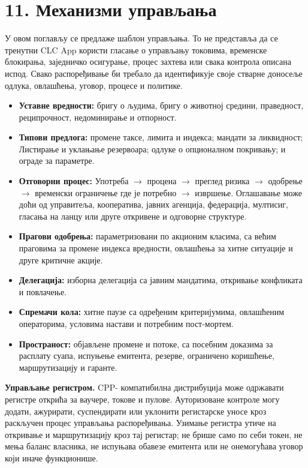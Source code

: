 \documentclass[11pt]{article}
\begin{document}
\section*{11. Механизми управљања}

У овом поглављу се предлаже шаблон управљања. То не представља да се тренутни CLC App користи гласање о управљању токовима, временске блокирања, заједничко осигурање, процес захтева или свака контрола описана испод. Свако распоређивање би требало да идентификује своје стварне доносеље одлука, овлашћења, уговор, процесе и политике.

\begin{itemize}[leftmargin=*]
\item \textbf{Уставне вредности:} бригу о људима, бригу о животној средини, праведност, реципрочност, недоминирање и отпорност.
\item \textbf{Типови предлога:} промене таксе, лимита и индекса; мандати за ликвидност; Листирање и уклањање резервоара; одлуке о опционалном покривању; и ограде за параметре.
\item \textbf{Отговорни процес:} Употреба $\to$ процена $\to$ преглед ризика $\to$ одобрење $\to$ временски ограничење где је потребно $\to$ извршење. Оглашавање може доћи од управитеља, кооператива, јавних агенција, федерација, мултисиг, гласања на ланцу или друге откривене и одговорне структуре.
\item \textbf{Прагови одобрења:} параметризовани по акционим класима, са већим праговима за промене индекса вредности, овлашћења за хитне ситуације и друге критичне акције.
\item \textbf{Делегација:} изборна делегација са јавним мандатима, откривање конфликата и повлачење.
\item \textbf{Спремачи кола:} хитне паузе са одређеним критеријумима, овлашћеним операторима, условима настави и потребним пост-мортем.
\item \textbf{Пространост:} објављене промене и потоке, са посебним доказима за расплату суапа, испуњење емитента, резерве, ограничено коришћење, маршрутизацију и гаранте.
\end{itemize}
\textbf{Управљање регистром.} CPP- компатибилна дистрибуција може одржавати регистре открића за ваучере, токове и пулове. Ауторизоване контроле могу додати, ажурирати, суспендирати или уклонити регистарске уносе кроз раскључен процес управљања распоређивања. Узимање регистра утиче на откривање и маршрутизацију кроз тај регистар; не брише само по себи токен, не мења баланс власника, не испуњава обавезе емитента или не онемогућава уговор који иначе функционише.
\end{document}
